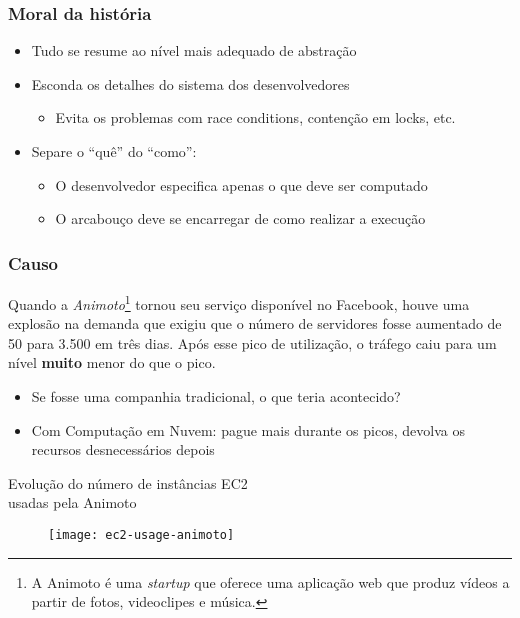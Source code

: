 \documentclass[Ligatures=TeX,table,brazil,svgnames,usetotalslideindicator,comp
ress,10pt]{beamer}
\begin{document}
\begin{frame}
  \frametitle{Moral da história}
  \begin{itemize}
  \item Tudo se resume ao nível mais adequado de abstração
  \item Esconda os detalhes do sistema dos desenvolvedores
    \begin{itemize}
    \item Evita os problemas com race conditions, contenção em locks, etc.
    \end{itemize}
  \item Separe o \alert{``quê''} do \alert{``como''}:
    \begin{itemize}
    \item O desenvolvedor especifica apenas o \alert{que} deve ser computado
    \item O arcabouço deve se encarregar de \alert{como} realizar a
      execução
    \end{itemize}
  \end{itemize}

  \centering

\end{frame}

\begin{frame}
  \frametitle{Causo}
  \begin{block}{}
    Quando a \emph{Animoto}\footnote{A Animoto é uma \textit{startup} que oferece uma aplicação
    web que produz vídeos a partir de fotos, videoclipes e música.}
    tornou seu serviço disponível no Facebook, houve uma explosão na
    demanda que exigiu que o número de servidores fosse aumentado de
    50 para 3.500 em \alert{três} dias. Após esse pico de utilização,
    o tráfego caiu para um nível \textbf{muito} menor do que o pico.
  \end{block}

  \begin{itemize}
  \item Se fosse uma companhia tradicional, o que teria acontecido?
  \item Com Computação em Nuvem: pague mais durante os picos, devolva os
    recursos desnecessários depois
  \end{itemize}

\end{frame}

\begin{frame}{Evolução do número de instâncias EC2\\ usadas pela Animoto}
  \begin{figure}
    \centering
    \texttt{[image: ec2-usage-animoto]}
  \end{figure}
\end{frame}
\end{document}
